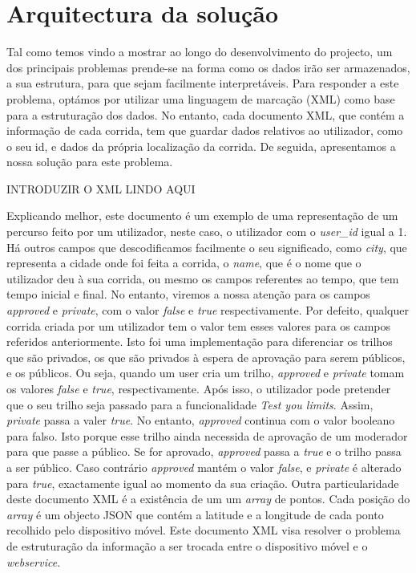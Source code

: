 \documentclass[twocolumn,twoside,10pt,a4paper]{article}
\begin{document}
\section{Arquitectura da solução}
Tal como temos vindo a mostrar ao longo do desenvolvimento do projecto, um dos principais problemas prende-se na forma como os dados irão ser armazenados, a sua estrutura, para que sejam facilmente interpretáveis. Para responder a este problema, optámos por utilizar uma linguagem de marcação (XML) como base para a estruturação dos dados. No entanto, cada documento XML, que contém a informação de cada corrida, tem que guardar dados relativos ao utilizador, como o seu id, e dados da própria localização da corrida. De seguida, apresentamos a nossa solução para este problema.

INTRODUZIR O XML LINDO AQUI

Explicando melhor, este documento é um exemplo de uma representação de um percurso feito por um utilizador, neste caso, o utilizador com o \textit{user\_id} igual a 1. Há outros campos que descodificamos facilmente o seu significado, como \textit{city}, que representa a cidade onde foi feita a corrida, o \textit{name}, que é o nome que o utilizador deu à sua corrida, ou mesmo os campos referentes ao tempo, que tem tempo inicial e final. No entanto, viremos a nossa atenção para os campos \textit{approved} e \textit{private}, com o valor \textit{false} e \textit{true} respectivamente. Por defeito, qualquer corrida criada por um utilizador tem o valor tem esses valores para os campos referidos anteriormente. Isto foi uma implementação para diferenciar os trilhos que são privados, os que são privados à espera de aprovação para serem públicos, e os públicos. Ou seja, quando um user cria um trilho, \textit{approved} e \textit{private} tomam os valores \textit{false} e \textit{true}, respectivamente. Após isso, o utilizador pode pretender que o seu trilho seja passado para a funcionalidade \textit{Test you limits}. Assim, \textit{private} passa a valer \textit{true}. No entanto, \textit{approved} continua com o valor booleano para falso. Isto porque esse trilho ainda necessida de aprovação de um moderador para que passe a público. Se for aprovado, \textit{approved} passa a \textit{true} e o trilho passa a ser público. Caso contrário \textit{approved} mantém o valor \textit{false}, e \textit{private} é alterado para \textit{true}, exactamente igual ao momento da sua criação.
Outra particularidade deste documento XML é a existência de um um \textit{array} de pontos. Cada posição do \textit{array} é um objecto JSON que contém a latitude e a longitude de cada ponto recolhido pelo dispositivo móvel.
Este documento XML visa resolver o problema de estruturação da informação a ser trocada entre o dispositivo móvel e o \textit{webservice}. 
\end{document}
